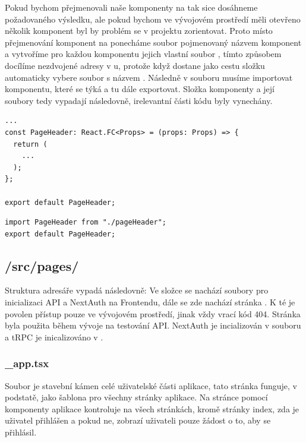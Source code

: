 Pokud bychom přejmenovali naše komponenty na  tak sice dosáhneme požadovaného výsledku, ale pokud bychom ve vývojovém prostředí měli otevřeno několik komponent byl by problém se v projektu zorientovat.
Proto místo přejmenování komponent na  ponecháme soubor pojmenovaný názvem komponent a vytvoříme pro každou komponentu jejich vlastní soubor , tímto způsobem docílíme nezdvojené adresy v u, protože když  dostane jako cestu složku automaticky vybere soubor s názvem . Následně v souboru  musíme importovat komponentu, které se týká a tu dále exportovat. Složka komponenty a její soubory tedy vypadají následovně, irelevantní části kódu byly vynechány.
\begin{lstlisting}[caption=Deklarace komponenty pageHeader]
...
const PageHeader: React.FC<Props> = (props: Props) => {
  return (
    ...
  );
};

export default PageHeader;
\end{lstlisting}
\begin{lstlisting}[caption=Soubor index.tsx komponenty pageHeader]
import PageHeader from "./pageHeader";
export default PageHeader;
\end{lstlisting}
\subsection{/src/pages/}
Struktura adresáře  vypadá následovně:
\hfill \break
Ve složce  se nachází soubory pro inicializaci API a NextAuth na Frontendu, dále se zde nachází stránka . K té je povolen přístup pouze ve vývojovém prostředí, jinak vždy vrací kód 404. Stránka byla použita během vývoje na testování API. NextAuth je incializován v souboru  a tRPC je inicalizováno v .

\subsubsection{\_app.tsx}
Soubor  je stavební kámen celé uživatelské části aplikace, tato stránka funguje, v podstatě, jako šablona pro všechny stránky aplikace. Na stránce pomocí komponenty  aplikace kontroluje na všech stránkách, kromě stránky index, zda je uživatel přihlášen a pokud ne, zobrazí uživateli pouze žádost o to, aby se přihlásil.

